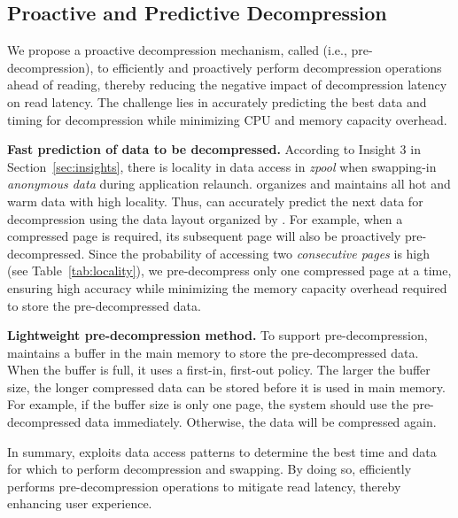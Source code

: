 \subsection{Proactive and Predictive Decompression}
\label{sec:ecivtion}
We propose a proactive decompression mechanism, called \predi  
(i.e., pre-decompression), to efficiently and proactively perform decompression operations ahead of reading, thereby reducing the negative impact of decompression latency on read latency. The challenge lies in accurately predicting the best data and timing for decompression while minimizing CPU and memory capacity overhead.

\noindent\textbf{Fast prediction of data to be decompressed.}
According to Insight 3 in Section~\ref{sec:insights}, there is locality in data access in  \emph{zpool} when swapping-in \emph{anonymous data} during application relaunch. \dataorg organizes and maintains all hot and warm data with high locality. Thus, \predi can accurately predict the next data for decompression using the data layout organized by \dataorg. For example, when a compressed page is required, its subsequent page will also be proactively pre-decompressed. Since the probability of accessing two \emph{consecutive pages} is high (see Table~\ref{tab:locality}), we pre-decompress only one compressed page at a time, ensuring high accuracy while minimizing the memory capacity overhead required to store the pre-decompressed data.

\noindent\textbf{Lightweight pre-decompression method.} To support pre-decompression, \proposal maintains a buffer in the main memory to store the pre-decompressed data. When the buffer is full, it uses a first-in, first-out policy. The larger the buffer size, the longer compressed data can be stored before it is used in main memory. For example, if the buffer size is only one page, the system should use the pre-decompressed data immediately. Otherwise, the data will be compressed again. 

In summary, \predi exploits data access patterns to determine the best time and data for which to perform decompression and swapping. By doing so, \predi efficiently performs pre-decompression operations to mitigate read latency, thereby enhancing user experience. 

